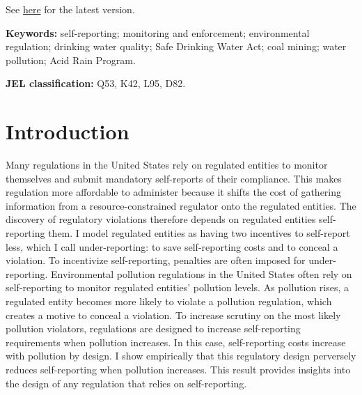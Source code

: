 \documentclass[12pt]{article}
\begin{document}
\begingroup
\centering\footnotesize
See \href{https://www.emilkeetui.com/files/keetui-jmp.pdf}{here} for the latest version.\par
\endgroup

\begingroup
\vspace{0.5em}
\centering
\begin{minipage}{0.85\textwidth}
\singlespacing\footnotesize
\noindent\textbf{Keywords:} self-reporting; monitoring and enforcement; environmental regulation; drinking water quality; Safe Drinking Water Act; coal mining; water pollution; Acid Rain Program.
\par\smallskip
\noindent\textbf{JEL classification:} Q53, K42, L95, D82.
\end{minipage}
\par
\endgroup

\newpage
\onehalfspacing


\section{Introduction}

Many regulations in the United States rely on regulated entities to monitor themselves and submit mandatory self-reports of their compliance. This makes regulation more affordable to administer because it shifts the cost of gathering information from a resource-constrained regulator onto the regulated entities. The discovery of regulatory violations therefore depends on regulated entities self-reporting them. I model regulated entities as having two incentives to self-report less, which I call under-reporting: to save self-reporting costs and to conceal a violation. To incentivize self-reporting, penalties are often imposed for under-reporting. Environmental pollution regulations in the United States often rely on self-reporting to monitor regulated entities' pollution levels. As pollution rises, a regulated entity becomes more likely to violate a pollution regulation, which creates a motive to conceal a violation. To increase scrutiny on the most likely pollution violators, regulations are designed to increase self-reporting requirements when pollution increases. In this case, self-reporting costs increase with pollution by design. I show empirically that this regulatory design perversely reduces self-reporting when pollution increases. This result provides insights into the design of any regulation that relies on self-reporting. 
\end{document}
